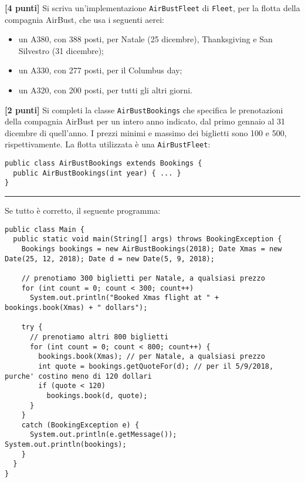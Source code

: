 \documentclass{article}[10pt]
\newcounter{esnu}
\newenvironment{esercizio}{\medskip \noindent {\bf Esercizio\addtocounter{esnu}{1} \arabic{esnu}}}{}
\begin{document}
\begin{esercizio}
\textbf{[4 punti]}
%
Si scriva un'implementazione \texttt{AirBustFleet} di \texttt{Fleet}, per la flotta della compagnia AirBust,
che usa i seguenti aerei:
\begin{itemize}
  \setlength{\itemsep}{1pt}
  \setlength{\parskip}{0pt}
  \setlength{\parsep}{0pt}
\item un A380, con 388 posti, per Natale (25 dicembre), Thanksgiving e San Silvestro (31 dicembre);
\item un A330, con 277 posti, per il Columbus day;
\item un A320, con 200 posti, per tutti gli altri giorni.
\end{itemize}
%
\end{esercizio}

\begin{esercizio}
\textbf{[2 punti]}
Si completi la classe \texttt{AirBustBookings} che specifica le prenotazioni
della compagnia AirBust per un intero anno indicato, dal primo gennaio al 31 dicembre di quell'anno.
I prezzi minimi e massimo dei biglietti sono 100 e 500, rispettivamente. La flotta utilizzata \`e una
\texttt{AirBustFleet}:

{\small\begin{verbatim}
public class AirBustBookings extends Bookings {
  public AirBustBookings(int year) { ... }
}
\end{verbatim}}
%
\end{esercizio}

\hrule
\vspace*{2ex}

Se tutto \`e corretto, il seguente programma:

{\scriptsize\begin{verbatim}
public class Main {
  public static void main(String[] args) throws BookingException {
    Bookings bookings = new AirBustBookings(2018); Date Xmas = new Date(25, 12, 2018); Date d = new Date(5, 9, 2018);

    // prenotiamo 300 biglietti per Natale, a qualsiasi prezzo
    for (int count = 0; count < 300; count++)
      System.out.println("Booked Xmas flight at " + bookings.book(Xmas) + " dollars");

    try {
      // prenotiamo altri 800 biglietti
      for (int count = 0; count < 800; count++) {
        bookings.book(Xmas); // per Natale, a qualsiasi prezzo
        int quote = bookings.getQuoteFor(d); // per il 5/9/2018, purche' costino meno di 120 dollari
        if (quote < 120)
          bookings.book(d, quote);
      }
    }
    catch (BookingException e) {
      System.out.println(e.getMessage()); System.out.println(bookings);
    }
  }
}
\end{verbatim}}
  
\end{document}
